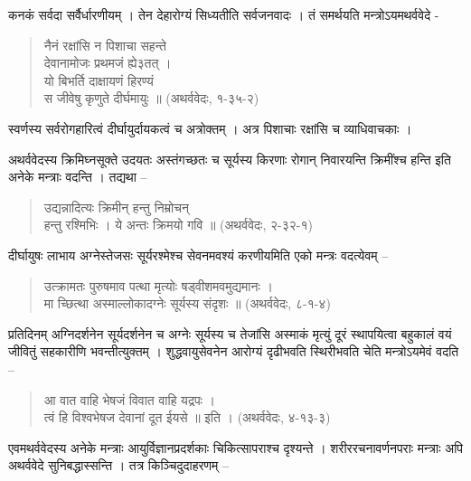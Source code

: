 कनकं सर्वदा सर्वैर्धारणीयम् । तेन देहारोग्यं सिध्यतीति सर्वजनवादः । तं समर्थयति मन्त्रोऽयमथर्ववेदे -
\begin{verse}
नैनं रक्षांसि न पिशाचा सहन्ते\\
देवानामोजः प्रथमजं ह्ये३तत् ।\\
यो बिभर्ति दाक्षायणं हिरण्यं\\
स जीवेषु कृणुते दीर्घमायुः ॥ (अथर्ववेदः, १-३५-२)
\end{verse}
स्वर्णस्य सर्वरोगहारित्वं दीर्घायुर्दायकत्वं च अत्रोक्तम् । अत्र पिशाचाः रक्षांसि च व्याधिवाचकाः ।

अथर्ववेदस्य क्रिमिघ्नसूक्ते उदयतः अस्तंगच्छतः च सूर्यस्य किरणाः रोगान् निवारयन्ति क्रिमींश्च हन्ति इति अनेके मन्त्राः वदन्ति । तद्यथा –
\begin{verse}
उद्यन्नादित्यः क्रिमीन् हन्तु निम्रोचन्\\
हन्तु रश्मिभिः । ये अन्तः क्रिमयो गवि ॥ (अथर्ववेदः, २-३२-१)
\end{verse}
दीर्घायुषः लाभाय अग्नेस्तेजसः सूर्यरश्मेश्च सेवनमवश्यं करणीयमिति एको मन्त्रः वदत्येवम् –
\begin{verse}
उत्क्रामतः पुरुषमाव पत्था मृत्योः षड्वीशमवमुद्यमानः ।\\
मा च्छित्था अस्माल्लोकादग्नेः सूर्यस्य संदृशः ॥ (अथर्ववेदः, ८-१-४)
\end{verse}
प्रतिदिनम् अग्निदर्शनेन सूर्यदर्शनेन च अग्नेः सूर्यस्य च तेजांसि अस्माकं मृत्युं दूरं स्थापयित्वा बहुकालं वयं जीवितुं सहकारीणि भवन्तीत्युक्तम् । शुद्धवायुसेवनेन आरोग्यं दृढीभवति स्थिरीभवति चेति मन्त्रोऽयमेवं वदति –
\begin{verse}
आ वात वाहि भेषजं विवात वाहि यद्रपः ।\\
त्वं हि विश्वभेषज देवानां दूत ईयसे ॥ इति । (अथर्ववेदः, ४-१३-३)
\end{verse}
एवमथर्ववेदस्य अनेके मन्त्राः आयुर्विज्ञानप्रदर्शकाः चिकित्सापराश्च दृश्यन्ते । शरीररचनावर्णनपराः मन्त्राः अपि अथर्ववेदे सुनिबद्धास्सन्ति । तत्र किञ्चिदुदाहरणम् –
